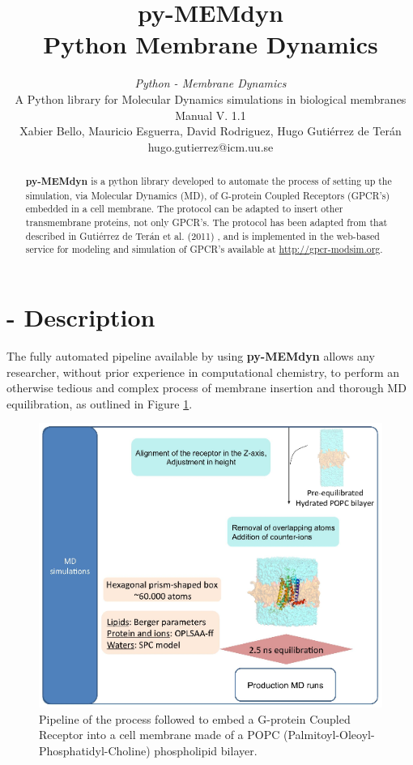 \documentclass[10pt, oneside, pdftex]{article}
\title{py-MEMdyn \\ 
\large \vspace*{-10pt}Python Membrane Dynamics\vspace*{10pt}}
\author{%
\textit{Python - Membrane Dynamics} \\
A Python library for Molecular Dynamics simulations in biological membranes\\
Manual V. 1.1 \\
Xabier Bello, Mauricio Esguerra, David Rodriguez, Hugo Guti\'{e}rrez de Ter\'{a}n \\
hugo.gutierrez@icm.uu.se \\
\vspace{20pt}
}
\makeatletter
\def\printtitle{%
{\color{bl} \centering \huge  \textbf{\@title}\par}}	%
\def\printauthor{%
{\centering \small \@author}}				%
\makeatother
\begin{document}
\printtitle 
\printauthor

\begin{abstract}
\noindent \textbf{py-MEMdyn} is a python library developed to automate
the process of setting up the simulation, via Molecular Dynamics (MD),
of G-protein  Coupled Receptors (GPCR's) embedded in  a cell membrane.
The protocol  can be adapted  to insert other  transmembrane proteins,
not only GPCR's.  The protocol has been adapted from that described in
Guti\'{e}rrez de Ter\'{a}n et al.  (2011) \cite{rodriguez2011}, and is
implemented in  the web-based service  for modeling and  simulation of
GPCR's available at \url{http://gpcr-modsim.org}.
\end{abstract}

\section*{ - Description}
The  fully automated  pipeline available  by  using \textbf{py-MEMdyn}
allows  any  researcher,  without  prior experience  in  computational
chemistry,  to perform  an otherwise  tedious and  complex  process of
membrane  insertion  and thorough  MD  equilibration,  as outlined  in
Figure \ref{fig:pipeline}.

\begin{figure}[htbp]
\centering
\includegraphics[scale=0.6]{pipeline.png}
\caption{Pipeline of the process followed to embed a G-protein Coupled
  Receptor    into    a   cell    membrane    made    of   a   POPC
  (Palmitoyl-Oleoyl-Phosphatidyl-Choline) phospholipid bilayer.}
\label{fig:pipeline}
\end{figure} 
\end{document}
